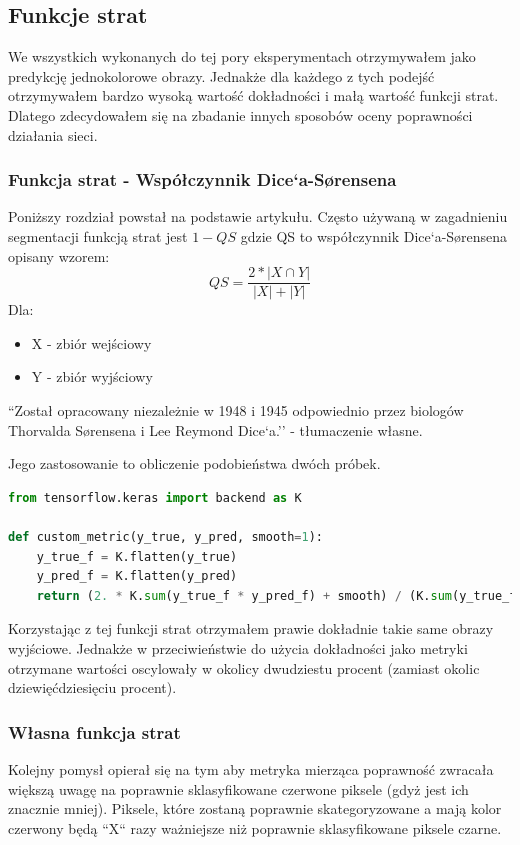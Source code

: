 \documentclass{article}
\begin{document}
\subsection{Funkcje strat}
We wszystkich wykonanych do tej pory eksperymentach otrzymywałem jako predykcję jednokolorowe obrazy.
Jednakże dla każdego z tych podejść otrzymywałem bardzo wysoką wartość dokładności i małą wartość funkcji strat.
Dlatego zdecydowałem się na zbadanie innych sposobów oceny poprawności działania sieci.
\subsubsection{Funkcja strat - Współczynnik Dice`a-Sørensena}
Poniższy rozdział powstał na podstawie artykułu\cite{coefficient}.
Często używaną w zagadnieniu segmentacji funkcją strat jest $1-QS$ gdzie QS to współczynnik Dice`a-Sørensena opisany wzorem:
\begin{equation}
    QS = \frac{2*|X \cap Y|}{|X|+|Y|}
\end{equation}
Dla:
\begin{itemize}
    \item X - zbiór wejściowy
    \item Y - zbiór wyjściowy
\end{itemize}

``Został opracowany niezależnie w 1948 i 1945 odpowiednio przez biologów Thorvalda Sørensena i Lee Reymond Dice`a.''\cite{coefficient} - tłumaczenie własne.

Jego zastosowanie to obliczenie podobieństwa dwóch próbek.

\begin{lstlisting}[caption={Implementacja przy użyciu Keras i TensorFlow\cite{diceimpl}},language=python]
from tensorflow.keras import backend as K

def custom_metric(y_true, y_pred, smooth=1):
    y_true_f = K.flatten(y_true)
    y_pred_f = K.flatten(y_pred)
    return (2. * K.sum(y_true_f * y_pred_f) + smooth) / (K.sum(y_true_f) + K.sum(y_pred_f) + smooth)

\end{lstlisting}

Korzystając z tej funkcji strat otrzymałem prawie dokładnie takie same obrazy wyjściowe.
Jednakże w przeciwieństwie do użycia dokładności jako metryki otrzymane wartości oscylowały w okolicy dwudziestu procent (zamiast okolic dziewięćdziesięciu procent).

\subsubsection{Własna funkcja strat}
Kolejny pomysł opierał się na tym aby metryka mierząca poprawność zwracała większą uwagę na poprawnie sklasyfikowane czerwone piksele (gdyż jest ich znacznie mniej).
Piksele, które zostaną poprawnie skategoryzowane a mają kolor czerwony będą ``X`` razy ważniejsze niż poprawnie sklasyfikowane piksele czarne.
\end{document}

